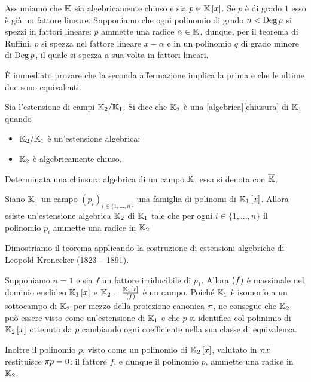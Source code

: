 \Proof Assumiamo che $\mathbb{K}$ sia algebricamente chiuso e sia $p \in \mathbb{K} \left [ x \right ]$. Se $p$ \`e di grado $1$ esso \`e gi\`a un fattore lineare. Supponiamo che ogni polinomio di grado $n < \operatorname{Deg}{p}$ si spezzi in fattori lineare: $p$ ammette una radice $\alpha \in \mathbb{K}$, dunque, per il teorema di Ruffini, $p$ si spezza nel fattore lineare $x - \alpha$ e in un polinomio $q$ di grado minore di $\operatorname{Deg}{p}$, il quale si spezza a sua volta in fattori lineari.
\par \`E immediato provare che la seconda affermazione implica la prima e che le ultime due sono equivalenti. \EndProof
\begin{Definition}
	Sia l'estensione di campi $\mathbb{K}_2/\mathbb{K}_1$. Si dice che $\mathbb{K}_2$ \`e una [algebrica][chiusura] di $\mathbb{K}_1$ quando
	\begin{itemize}
		\item $\mathbb{K}_2/\mathbb{K}_1$ \`e un'estensione algebrica;
		\item $\mathbb{K}_2$ \`e algebricamente chiuso.
	\end{itemize}
	Determinata una chiusura algebrica di un campo $\mathbb{K}$, essa si denota con $\overline{\mathbb{K}}$.
\end{Definition}
\begin{Theorem}\label{th_esistenzaradici}
	Siano $\mathbb{K}_1$ un campo $(p_i)_{i \in \lbrace 1, ..., n \rbrace}$ una famiglia di polinomi di $\mathbb{K}_1 \left [ x \right ]$. Allora esiste un'estensione algebrica $\mathbb{K}_2$ di $\mathbb{K}_1$ tale che per ogni $i \in \lbrace 1, ..., n \rbrace$ il polinomio $p_i$ ammette una radice in $\mathbb{K}_2$
\end{Theorem}
\Proof Dimostriamo il teorema applicando la costruzione di estensioni algebriche di Leopold Kronecker (1823 -- 1891).
\par Supponiamo $n = 1$ e sia $f$ un fattore irriducibile di $p_1$. Allora $\left ( f \right )$ \`e massimale nel dominio euclideo $\mathbb{K}_1 \left [ x \right ]$ e $\mathbb{K}_2 = \frac{\mathbb{K}_1 \left [ x \right ]}{\left ( f \right )}$ \`e un campo. Poich\'e $\mathbb{K}_1$ \`e isomorfo a un sottocampo di $\mathbb{K}_2$ per mezzo della proiezione canonica $\Projection$, ne consegue che $\mathbb{K}_2$ pu\`o essere visto come un'estensione di $\mathbb{K}_1$ e che $p$ si identifica col polinimio di $\mathbb{K}_2 \left [ x \right ]$ ottenuto da $p$ cambiando ogni coefficiente nella sua classe di equivalenza.
\par Inoltre il polinomio $p$, visto come un polinomio di $\mathbb{K}_2 \left [ x \right ]$, valutato in $\Projection{x}$ restituisce $\Projection{p} = 0$: il fattore $f$, e dunque il polinomio $p$, ammette una radice in $\mathbb{K}_2$.
